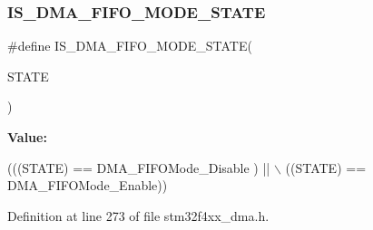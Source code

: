 \subsubsection{\texorpdfstring{I\+S\+\_\+\+D\+M\+A\+\_\+\+F\+I\+F\+O\+\_\+\+M\+O\+D\+E\+\_\+\+S\+T\+A\+TE}{IS\_DMA\_FIFO\_MODE\_STATE}}
{\footnotesize\ttfamily \#define I\+S\+\_\+\+D\+M\+A\+\_\+\+F\+I\+F\+O\+\_\+\+M\+O\+D\+E\+\_\+\+S\+T\+A\+TE(\begin{DoxyParamCaption}\item[{}]{S\+T\+A\+TE }\end{DoxyParamCaption})}

{\bfseries Value\+:}
\begin{DoxyCode}
(((STATE) == DMA\_FIFOMode\_Disable ) || \(\backslash\)
                                       ((STATE) == DMA\_FIFOMode\_Enable))
\end{DoxyCode}


Definition at line 273 of file stm32f4xx\+\_\+dma.\+h.

